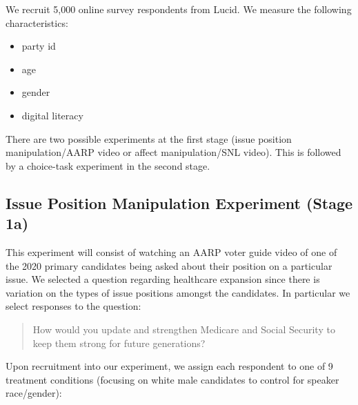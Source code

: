
We recruit 5,000 online survey respondents from Lucid. We measure the following characteristics:

\begin{itemize}
\item party id
\item age
\item gender
\item digital literacy
\end{itemize}

There are two possible experiments at the first stage (issue position
manipulation/AARP video or affect manipulation/SNL video). This is
followed by a choice-task experiment in the second stage.

\subsection{Issue Position Manipulation Experiment (Stage 1a)}

This experiment will consist of watching an AARP voter guide video of
one of the 2020 primary candidates being asked about their position on
a particular issue. We selected a question regarding healthcare
expansion since there is variation on the types of issue positions
amongst the candidates. In particular we select responses to the
question:

\begin{quotation}  
How would you update and strengthen Medicare and Social Security to
keep them strong for future generations?
\end{quotation}
  
Upon recruitment into our experiment, we assign each respondent to one
of 9 treatment conditions (focusing on white male candidates to
control for speaker race/gender):

